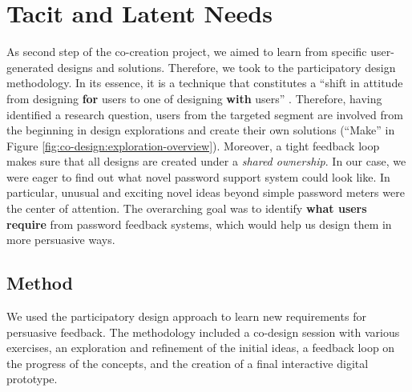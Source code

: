 \section{Tacit and Latent Needs}\label{sec:codesign:part2}
As second step of the co-creation project, we aimed to learn from specific user-generated designs and solutions. Therefore, we took to the participatory design methodology. In its essence, it is a technique that constitutes a ``shift in attitude from designing \textbf{for} users to one of designing \textbf{with} users'' \cite{Sanders2002ParticipatoryDesign}. Therefore, having identified a research question, users from the targeted segment are involved from the beginning in design explorations and create their own solutions (``Make'' in Figure \ref{fig:co-design:exploration-overview}). Moreover, a tight feedback loop makes sure that all designs are created under a \textit{shared ownership}. In our case, we were eager to find out what novel password support system could look like. In particular, unusual and exciting novel ideas beyond simple password meters were the center of attention. The overarching goal was to identify \textbf{what users require} from password feedback systems, which would help us design them in more persuasive ways.






\subsection{Method}
We used the participatory design approach to learn new requirements for persuasive feedback. The methodology included a co-design session with various exercises, an exploration and refinement of the initial ideas, a feedback loop on the progress of the concepts, and the creation of a final interactive digital prototype.

